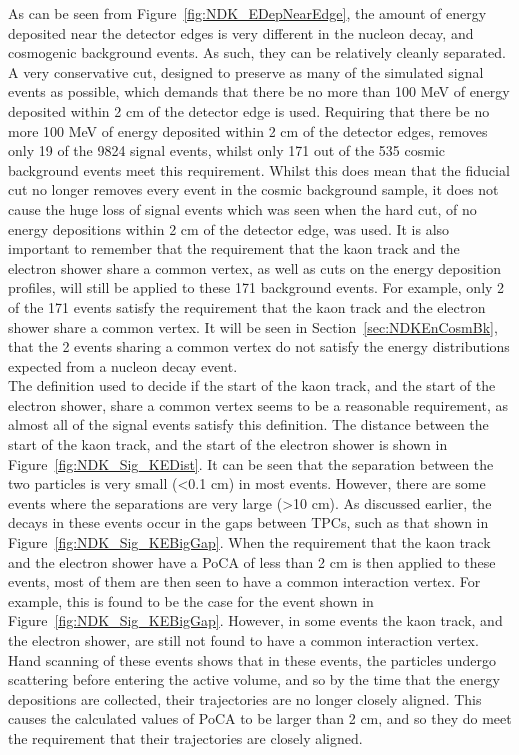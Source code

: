 As can be seen from Figure~\ref{fig:NDK_EDepNearEdge}, the amount of energy deposited near the detector edges is very different in the nucleon decay, and cosmogenic background events. As such, they can be relatively cleanly separated. A very conservative cut, designed to preserve as many of the simulated signal events as possible, which demands that there be no more than 100 MeV of energy deposited within 2 cm of the detector edge is used. Requiring that there be no more 100 MeV of energy deposited within 2 cm of the detector edges, removes only 19 of the 9824 signal events, whilst only 171 out of the 535 cosmic background events meet this requirement. Whilst this does mean that the fiducial cut no longer removes every event in the cosmic background sample, it does not cause the huge loss of signal events which was seen when the hard cut, of no energy depositions within 2 cm of the detector edge, was used. It is also important to remember that the requirement that the kaon track and the electron shower share a common vertex, as well as cuts on the energy deposition profiles, will still be applied to these 171 background events. For example, only 2 of the 171 events satisfy the requirement that the kaon track and the electron shower share a common vertex. It will be seen in Section~\ref{sec:NDKEnCosmBk}, that the 2 events sharing a common vertex do not satisfy the energy distributions expected from a nucleon decay event. \\

The definition used to decide if the start of the kaon track, and the start of the electron shower, share a common vertex seems to be a reasonable requirement, as almost all of the signal events satisfy this definition. The distance between the start of the kaon track, and the start of the electron shower is shown in Figure~\ref{fig:NDK_Sig_KEDist}. It can be seen that the separation between the two particles is very small (<0.1 cm) in most events. However, there are some events where the separations are very large (>10 cm). As discussed earlier, the decays in these events occur in the gaps between TPCs, such as that shown in Figure~\ref{fig:NDK_Sig_KEBigGap}. When the requirement that the kaon track and the electron shower have a PoCA of less than 2 cm is then applied to these events, most of them are then seen to have a common interaction vertex. For example, this is found to be the case for the event shown in Figure~\ref{fig:NDK_Sig_KEBigGap}. However, in some events the kaon track, and the electron shower, are still not found to have a common interaction vertex. Hand scanning of these events shows that in these events, the particles undergo scattering before entering the active volume, and so by the time that the energy depositions are collected, their trajectories are no longer closely aligned. This causes the calculated values of PoCA to be larger than 2 cm, and so they do meet the requirement that their trajectories are closely aligned. \\

